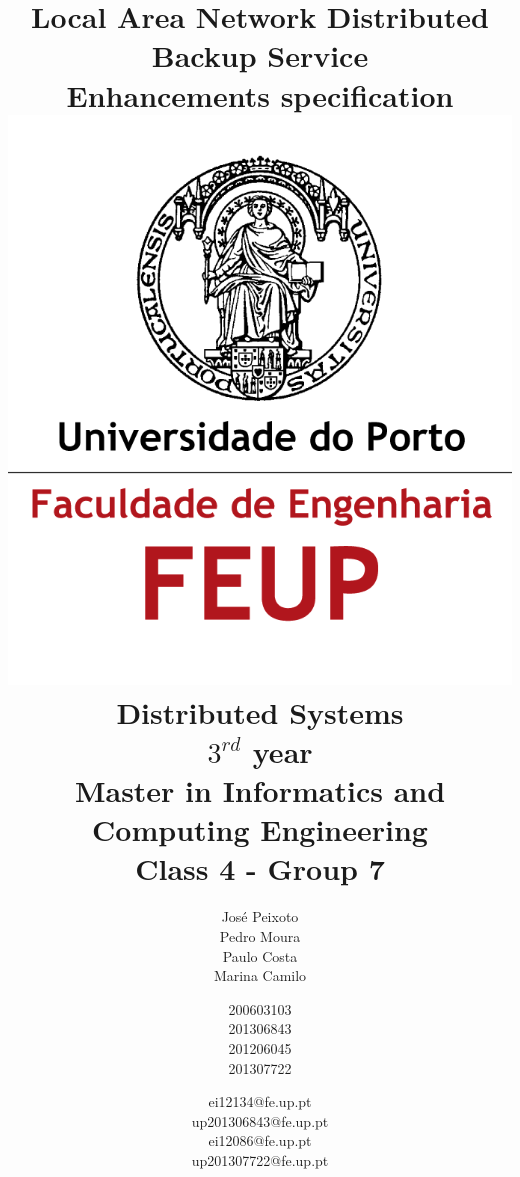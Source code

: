 \documentclass[a4paper,11pt]{article}
\begin{document}
\begin{titlepage}
\title{\huge \textbf{Local Area Network Distributed Backup Service\\[1cm] \Large Enhancements specification\\[1cm] \includegraphics{logo.png}\\[1cm] \large Distributed Systems\\[0.25cm] \small $3^{rd}$ year\\[0.05cm]Master in Informatics and Computing Engineering\\[1.7cm]}\normalsize Class 4 - Group 7}

\author{José Peixoto\\Pedro Moura\\Paulo Costa\\Marina Camilo \and 200603103\\201306843\\201206045\\201307722 \and ei12134@fe.up.pt \\ up201306843@fe.up.pt\\ei12086@fe.up.pt\\up201307722@fe.up.pt\\[0.5cm]}
\maketitle
\thispagestyle{empty} %
\end{titlepage}
\end{document}
